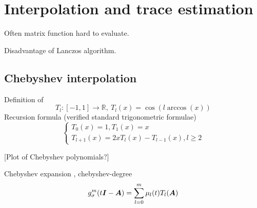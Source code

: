 \chapter{Interpolation and trace estimation}
\label{chp:2-chebyshev}

Often matrix function hard to evaluate.

Disadvantage of Lanczos algorithm.


\section{Chebyshev interpolation}
\label{sec:2-chebyshev-interpolation}

Definition of  \cite[Chapter~3]{trefethen2019chebyshev}
\begin{equation}
    T_l: [-1, 1] \to \mathbb{R},~T_l(x) = \cos(l \arccos(x))
    \label{equ:2-chebyshev-chebyshev-definition}
\end{equation}
Recursion formula (verified standard trigonometric formulae)
\begin{equation}
    \begin{cases}
        T_0(x) = 1, T_1(x) = x \\ T_{l+1}(x) = 2x T_l(x) - T_{l-1}(x), l \geq 2
    \end{cases}
    \label{equ:2-chebyshev-chebyshev-recursion}
\end{equation}

[Plot of Chebyshev polynomials?]

Chebyshev expansion \cite[Chapter~3]{trefethen2019chebyshev},
\gls{chebyshev-degree}
\begin{equation}
    g_{\sigma}^m(t\boldsymbol{I} - \boldsymbol{A}) = \sum_{l=0}^m \mu_l(t) T_l(\boldsymbol{A})
    \label{equ:2-chebyshev-chebyshev-expansion}
\end{equation}

